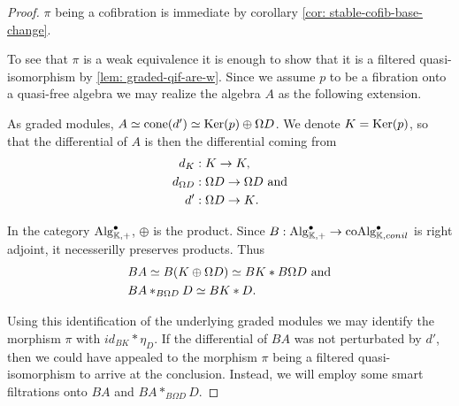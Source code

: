 \documentclass[../thesis.tex]{subfiles}
\begin{document}
            \begin{proof}
                $\pi$ being a cofibration is immediate by corollary \ref{cor: stable-cofib-base-change}. 
                
                To see that $\pi$ is a weak equivalence it is enough to show that it is a filtered quasi-isomorphism by \ref{lem: graded-qif-are-w}. Since we assume $p$ to be a fibration onto a quasi-free algebra we may realize the algebra $A$ as the following extension.
                \begin{center}
                \end{center}
                As graded modules, $A \simeq \tt{cone}(d') \simeq \tt{Ker}(p) \oplus \Omega D$. We denote $K = \tt{Ker}(p)$, so that the differential of $A$ is then the differential coming from 
                \begin{align*}
                    d_K & : K \rightarrow K, \\
                    d_{\Omega D} & : \Omega D \rightarrow \Omega D \tt{ and} \\
                    d' & : \Omega D \rightarrow K\tt{.}
                \end{align*}

                In the category $\tt{Alg}_{\mathbb{K},+}^\bullet$, $\oplus$ is the product. Since $B : \tt{Alg}_{\mathbb{K},+}^\bullet \rightarrow \tt{coAlg}_{\mathbb{K}, conil}^\bullet$ is right adjoint, it necesserilly preserves products. Thus
                \begin{align*}
                    & BA\simeq B(K\oplus \Omega D) \simeq BK \ast B\Omega D \tt{ and} \\
                    & BA \ast_{B\Omega D} D \simeq BK \ast D\tt{.}
                \end{align*}
                
                Using this identification of the underlying graded modules we may identify the morphism $\pi$ with $id_{BK} \ast \eta_D$. If the differential of $BA$ was not perturbated by $d'$, then we could have appealed to the morphism $\pi$ being a filtered quasi-isomorphism to arrive at the conclusion. Instead, we will employ some smart filtrations onto $BA$ and $BA \ast_{B\Omega D}D$.


\end{proof}
\end{document}
